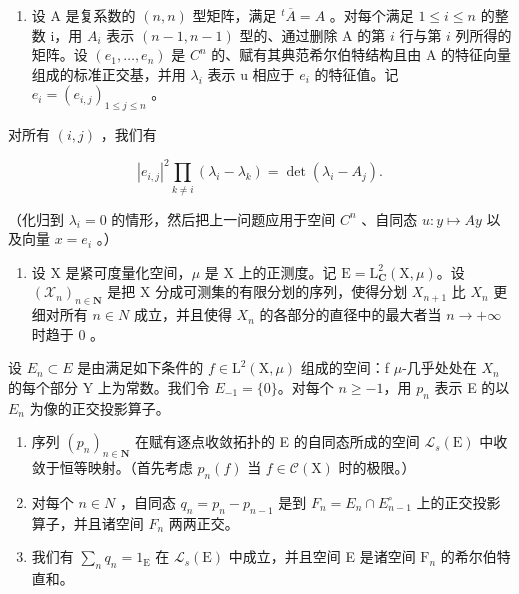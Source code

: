 \begin{enumerate}
\def\labelenumi{\alph{enumi})}
\setcounter{enumi}{1}
\tightlist
\item
  设 A 是复系数的 \((n,n)\) 型矩阵，满足 \({}^{t}\overline{A}=A\) 。对每个满足 \(1\leqslant i\leqslant n\) 的整数 i，用 \(A_{i}\) 表示 \((n-1,n-1)\) 型的、通过删除 A 的第 \(i\) 行与第 \(i\) 列所得的矩阵。设 \((e_{1},\ldots,e_{n})\) 是 \(C^{n}\) 的、赋有其典范希尔伯特结构且由 A 的特征向量组成的标准正交基，并用 \(\lambda_{i}\) 表示 u 相应于 \(e_{i}\) 的特征值。记 \(e_{i}=(e_{i,j})_{1\leqslant j\leqslant n}\) 。
\end{enumerate}

对所有 \((i,j)\) ，我们有

\[
\left| e _ {i, j} \right| ^ {2} \prod_ {k \neq i} \left(\lambda_ {i} - \lambda_ {k}\right) = \det \left(\lambda_ {i} - A _ {j}\right).
\]

（化归到 \(\lambda_{i}=0\) 的情形，然后把上一问题应用于空间 \(C^{n}\) 、自同态 \(u\colon y\mapsto Ay\) 以及向量 \(x=e_{i}\) 。）

\begin{enumerate}
\def\labelenumi{\arabic{enumi})}
\setcounter{enumi}{17}
\tightlist
\item
  设 X 是紧可度量化空间，\(\mu\) 是 X 上的正测度。记 \(\mathrm{E} = \mathrm{L}_{\mathbf{C}}^{2}(\mathrm{X}, \mu)\)。设 \((\mathcal{X}_{n})_{n \in \mathbf{N}}\) 是把 X 分成可测集的有限分划的序列，使得分划 \(X_{n+1}\) 比 \(X_{n}\) 更细对所有 \(n \in N\) 成立，并且使得 \(X_{n}\) 的各部分的直径中的最大者当 \(n \to +\infty\) 时趋于 0 。
\end{enumerate}

设 \(E_{n} \subset E\) 是由满足如下条件的 \(f \in \mathrm{L}^{2}(\mathrm{X}, \mu)\) 组成的空间：f \(\mu\)-几乎处处在 \(X_{n}\) 的每个部分 Y 上为常数。我们令 \(E_{-1} = \{0\}\)。对每个 \(n \geqslant -1\)，用 \(p_{n}\) 表示 E 的以 \(E_{n}\) 为像的正交投影算子。

\begin{enumerate}
\def\labelenumi{\alph{enumi})}
\item
  序列 \((p_{n})_{n\in\mathbf{N}}\) 在赋有逐点收敛拓扑的 E 的自同态所成的空间 \(\mathcal{L}_{s}(\mathrm{E})\) 中收敛于恒等映射。（首先考虑 \(p_{n}(f)\) 当 \(f\in\mathcal{C}(\mathrm{X})\) 时的极限。）
\item
  对每个 \(n \in N\) ，自同态 \(q_{n} = p_{n} - p_{n-1}\) 是到 \(F_{n} = E_{n} \cap E_{n-1}^{\circ}\) 上的正交投影算子，并且诸空间 \(F_{n}\) 两两正交。
\item
  我们有 \(\sum_{n} q_{n} = 1_{\mathrm{E}}\) 在 \(\mathcal{L}_s(\mathrm{E})\) 中成立，并且空间 E 是诸空间 \(\mathrm{F}_n\) 的希尔伯特直和。
\end{enumerate}

